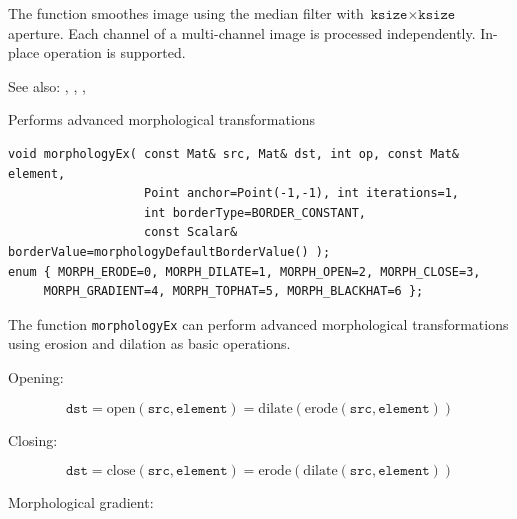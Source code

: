 The function smoothes image using the median filter with $\texttt{ksize} \times \texttt{ksize}$ aperture. Each channel of a multi-channel image is processed independently. In-place operation is supported.

See also: , , , 

\label{morphologyEx}
Performs advanced morphological transformations

\begin{lstlisting}
void morphologyEx( const Mat& src, Mat& dst, int op, const Mat& element,
                   Point anchor=Point(-1,-1), int iterations=1,
                   int borderType=BORDER_CONSTANT,
                   const Scalar& borderValue=morphologyDefaultBorderValue() );
enum { MORPH_ERODE=0, MORPH_DILATE=1, MORPH_OPEN=2, MORPH_CLOSE=3,
     MORPH_GRADIENT=4, MORPH_TOPHAT=5, MORPH_BLACKHAT=6 };
\end{lstlisting}
\begin{description}
\end{description}

The function \texttt{morphologyEx} can perform advanced morphological transformations using erosion and dilation as basic operations.

Opening:

\[
\texttt{dst}=\mathrm{open}(\texttt{src},\texttt{element})=\mathrm{dilate}(\mathrm{erode}(\texttt{src},\texttt{element}))
\]

Closing:

\[
\texttt{dst}=\mathrm{close}(\texttt{src},\texttt{element})=\mathrm{erode}(\mathrm{dilate}(\texttt{src},\texttt{element}))
\]

Morphological gradient:

